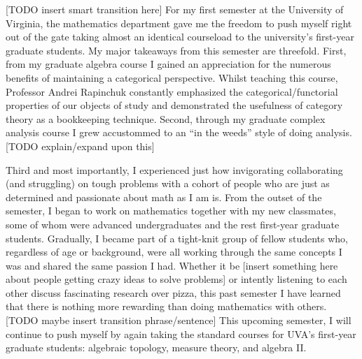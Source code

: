 \documentclass[12pt]{article}
\begin{document}

[TODO insert smart transition here] For my first semester at the University of Virginia, the mathematics department gave me the freedom to push myself right out of the gate taking almost an identical courseload to the university's first-year graduate students. My major takeaways from this semester are threefold. First, from my graduate algebra course I gained an appreciation for the numerous benefits of maintaining a categorical perspective.
Whilst teaching this course, Professor Andrei Rapinchuk constantly emphasized the categorical/functorial properties of our objects of study and demonstrated the usefulness of category theory as a bookkeeping technique. Second, through my graduate complex analysis course I grew accustommed to an ``in the weeds'' style of doing analysis. [TODO explain/expand upon this]



Third and most importantly, I experienced just how invigorating collaborating (and struggling) on tough problems with a cohort of people who are just as determined and passionate about math as I am is. From the outset of the semester, I began to work on mathematics together with my new classmates, some of whom were advanced undergraduates and the rest first-year graduate students. Gradually, I became part of a tight-knit group of fellow students who, regardless of age or background, were all working through the same concepts I was and shared the same passion I had. Whether it be [insert something here about people getting crazy ideas to solve problems] or intently listening to each other discuss fascinating research over pizza, this past semester I have learned that there is nothing more rewarding than doing mathematics with others.
\\

[TODO maybe insert transition phrase/sentence] This upcoming semester, I will continue to push myself by again taking the standard courses for UVA's first-year graduate students: algebraic topology, measure theory, and algebra II.
\\





\end{document}
